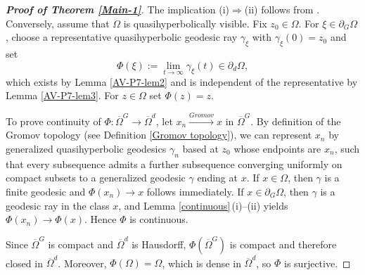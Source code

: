 \documentclass[a4paper,12pt]{amsart}
\theoremstyle{definition}
\begin{document}
\begin{proof}[\textbf{Proof of Theorem \ref{Main-1}}]
	The implication (i)$\Rightarrow$(ii) follows from \cite[Theorem 1.1]{Allu-2023}. Conversely, assume that $\Omega$ is quasihyperbolically visible. Fix $z_0\in\Omega$.
		For $\xi\in\partial_G\Omega$, choose a representative quasihyperbolic geodesic ray $\gamma_\xi$ with $\gamma_\xi(0)=z_0$ and set
		\[
		\Phi(\xi):=\lim_{t\to\infty}\gamma_\xi(t)\in\partial_d\Omega,
		\]
		which exists by Lemma \ref{AV-P7-lem2} and is independent of the representative by Lemma \ref{AV-P7-lem3}. For $z\in\Omega$ set $\Phi(z)=z$.
	
	To prove continuity of $\Phi:\overline{\Omega}^G\to\overline{\Omega}^d$, let $x_n\stackrel{Gromov}{\to}x$ in $\overline{\Omega}^G$.
	By definition of the Gromov topology (see Definition \ref{Gromov topology}), we can represent $x_n$ by generalized quasihyperbolic geodesics $\gamma_n$ based at $z_0$ whose endpoints are $x_n$, such that every subsequence admits a further subsequence converging uniformly on compact subsets to a generalized geodesic $\gamma$ ending at $x$.
	If $x\in\Omega$, then $\gamma$ is a finite geodesic and $\Phi(x_n)\to x$ follows immediately.
	If $x\in\partial_G\Omega$, then $\gamma$ is a geodesic ray in the class $x$, and Lemma \ref{continuous}\,(i)--(ii) yields $\Phi(x_n)\to \Phi(x)$.
	Hence $\Phi$ is continuous.
	
	Since $\overline{\Omega}^G$ is compact and $\overline{\Omega}^d$ is Hausdorff, $\Phi(\overline{\Omega}^G)$ is compact and therefore closed in $\overline{\Omega}^d$.
	Moreover, $\Phi(\Omega)=\Omega$, which is dense in $\overline{\Omega}^d$, so $\Phi$ is surjective.
	

\end{proof}
\end{document}
